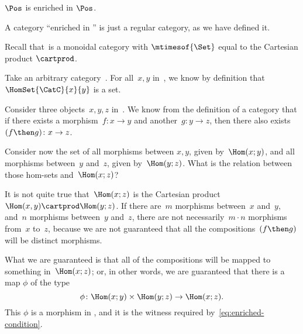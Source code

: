 \begin{example}
	$\Pos$ is enriched in $\Pos$.
\end{example}

\begin{example}

\end{example}

\begin{example}
	A category ``enriched in \Set'' is just a regular category, as we have defined it.

	Recall that~\Set is a monoidal category with $\mtimesof{\Set}$ equal to the Cartesian product $\cartprod$.

	Take an arbitrary category~\CatC.
	For all~$x, y$ in~\CatC, we know by definition that~$\HomSet{\CatC}{x}{y}$ is a set.

	Consider three objects~$x,y,z$ in~\CatC.
	We know from the definition of a category that if there exists a morphism~$f: x \to y$ and another~$g: y \to z$, then there also exists~$(f\then g)\colon x \to z$.

	Consider now the set of all morphisms between $x, y$, given by~$\Hom(x;y)$, and all morphisms between~$y$ and~$z$, given by~$\Hom(y; z)$.
	What is the relation between those hom-sets and~$\Hom(x; z)$?

	It is not quite true that~$\Hom(x; z)$ is the Cartesian product~$\Hom(x, y) \cartprod \Hom(y; z)$.
	If there are~$m$ morphisms between~$x$ and~$y$, and~$n$ morphisms between~$y$ and~$z$, there are not necessarily~$m \cdot n$ morphisms from~$x$ to~$z$, because we are not guaranteed that all the compositions~$(f\then g)$ will be distinct morphisms.

	What we are guaranteed is that all of the compositions will be mapped to something in~$\Hom(x; z)$; or, in other words, we are guaranteed that there is a map $\phi$ of the type
	\begin{equation*}
		\phi \colon \Hom(x; y) \times \Hom(y; z) \rightarrow \Hom(x; z).
	\end{equation*}
	This $\phi$ is a morphism in \Set, and it is the witness required by~\cref{eq:enriched-condition}.

\end{example}

